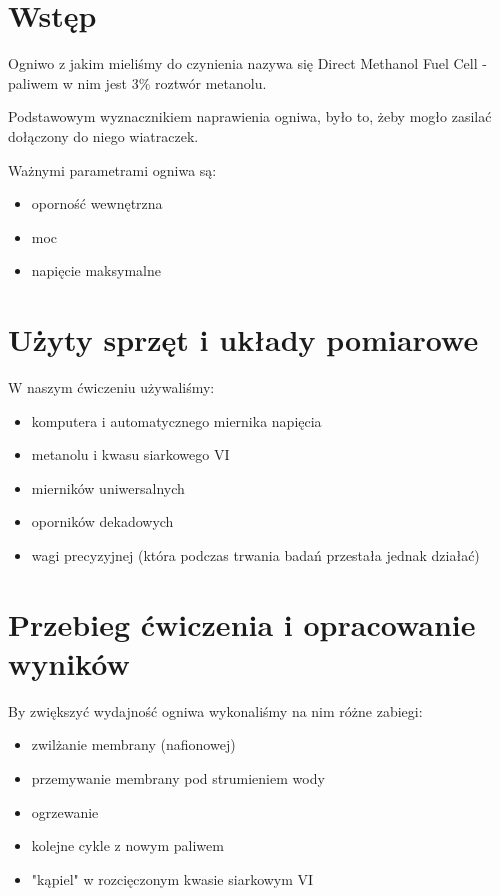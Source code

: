 \documentclass[a4paper,12pt]{article}
\begin{document}
\section{Wstęp}

Ogniwo z jakim mieliśmy do czynienia nazywa się Direct Methanol Fuel Cell - paliwem w nim jest 3$\%$ roztwór metanolu.

Podstawowym wyznacznikiem naprawienia ogniwa, było to, żeby mogło zasilać dołączony do niego wiatraczek.

Ważnymi parametrami ogniwa są:
\begin{itemize}
\item oporność wewnętrzna
\item moc
\item napięcie maksymalne
\end{itemize}
\section{Użyty sprzęt i układy pomiarowe}

W naszym ćwiczeniu używaliśmy:
\begin{itemize}
\item komputera i automatycznego miernika napięcia
\item metanolu i kwasu siarkowego VI
\item mierników uniwersalnych
\item oporników dekadowych
\item wagi precyzyjnej (która podczas trwania badań przestała jednak działać)
\end{itemize}

\section{Przebieg ćwiczenia i opracowanie wyników}




By zwiększyć wydajność ogniwa wykonaliśmy na nim różne zabiegi:
\begin{itemize}
\item zwilżanie membrany (nafionowej)
\item przemywanie membrany pod strumieniem wody
\item ogrzewanie
\item kolejne cykle z nowym paliwem
\item "kąpiel" w rozcięczonym kwasie siarkowym VI
\end{itemize}
\end{document}
